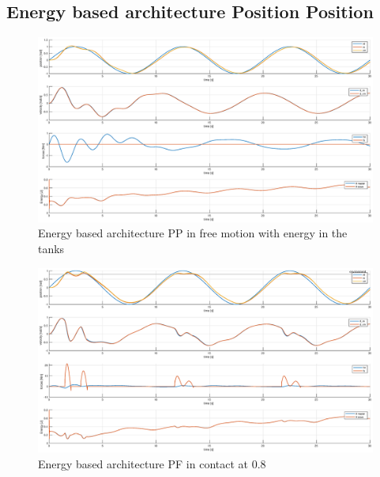 \documentclass[a4paper,12pt]{article}
\begin{document}
\newpage
\subsection{Energy based architecture Position Position}
\begin{figure}[H]
    \begin{center}
        \hspace*{-4.5cm}
        \includegraphics[scale=0.5]{images/energy_pp_free.eps}
    \end{center}
    \caption{Energy based architecture PP in free motion with energy in the tanks}
    \label{fig:energy_pp_free}
\end{figure}

\begin{figure}[H]
    \begin{center}
        \hspace*{-4.5cm}
        \includegraphics[scale=0.5]{images/energy_pp_contact.eps}
    \end{center}
    \caption{Energy based architecture PF in contact at 0.8}
    \label{fig:energy_pp_contact}
\end{figure}
\end{document}
